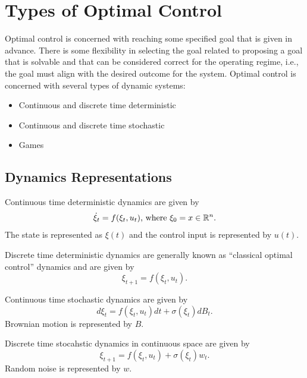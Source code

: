 % 
% 
%
%
% 
\mainmatter
\setcounter{page}{1}

\lectureseries[\course]{\course}

\date{September 24, 2009}

\setaddress

\setcounter{lecture}{0}
\setcounter{chapter}{0}


\section{Types of Optimal Control}
Optimal control is concerned with reaching some specified goal that is given in advance. There is some flexibility in selecting the goal related to proposing a goal that is solvable and that can be considered correct for the operating regime, i.e., the goal must align with the desired outcome for the system. Optimal control is concerned with several types of dynamic systems:

\begin{itemize}
  \item Continuous and discrete time deterministic
  \item Continuous and discrete time stochastic
  \item Games
\end{itemize}

\subsection{Dynamics Representations}
Continuous time deterministic dynamics are given by
$$\dot\xi_t = f(\xi_t,u_t) \textnormal{, where } \xi_0 = x \in \mathbb{R}^n.$$
The state is represented as $\xi(t)$ and the control input is represented by $u(t)$.

Discrete time deterministic dynamics are generally known as ``classical optimal control'' dynamics and are given by
$$\xi_{t+1} = f(\xi_t,u_t).$$

Continuous time stochastic dynamics are given by
$$d\xi_t = f(\xi_t,u_t)dt + \sigma(\xi_t)dB_t.$$
Brownian motion is represented by $B$.

Discrete time stocahstic dynamics in continuous space are given by
$$\xi_{t+1} = f(\xi_t,u_t) + \sigma(\xi_t)w_t.$$
Random noise is represented by $w$.

